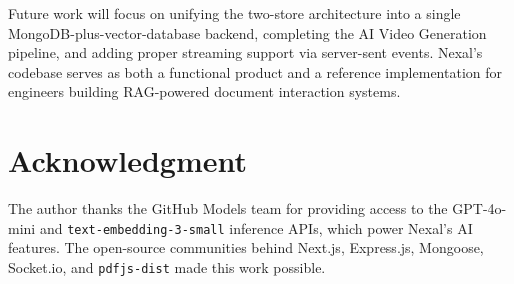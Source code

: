 \documentclass[conference]{IEEEtran}
\begin{document}
Future work will focus on unifying the two-store architecture into a single MongoDB-plus-vector-database backend, completing the AI Video Generation pipeline, and adding proper streaming support via server-sent events. Nexal's codebase serves as both a functional product and a reference implementation for engineers building RAG-powered document interaction systems.

\section*{Acknowledgment}

The author thanks the GitHub Models team for providing access to the GPT-4o-mini and \texttt{text-embedding-3-small} inference APIs, which power Nexal's AI features. The open-source communities behind Next.js, Express.js, Mongoose, Socket.io, and \texttt{pdfjs-dist} made this work possible.
\end{document}
